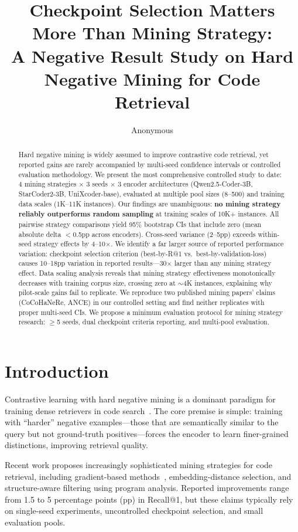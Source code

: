\documentclass[11pt,a4paper]{article}
\title{Checkpoint Selection Matters More Than Mining Strategy:\\A Negative Result Study on Hard Negative Mining for Code Retrieval}
\author{Anonymous}
\begin{document}
\maketitle

\begin{abstract}
Hard negative mining is widely assumed to improve contrastive code retrieval, yet reported gains are rarely accompanied by multi-seed confidence intervals or controlled evaluation methodology.
We present the most comprehensive controlled study to date: 4 mining strategies $\times$ 3 seeds $\times$ 3 encoder architectures (Qwen2.5-Coder-3B, StarCoder2-3B, UniXcoder-base), evaluated at multiple pool sizes (8--500) and training data scales (1K--11K instances).
Our findings are unambiguous: \textbf{no mining strategy reliably outperforms random sampling} at training scales of 10K+ instances.
All pairwise strategy comparisons yield 95\% bootstrap CIs that include zero (mean absolute delta $<$0.5pp across encoders).
Cross-seed variance (2--5pp) exceeds within-seed strategy effects by 4--10$\times$.
We identify a far larger source of reported performance variation: checkpoint selection criterion (best-by-R@1 vs.\ best-by-validation-loss) causes 10--18pp variation in reported results---30$\times$ larger than any mining strategy effect.
Data scaling analysis reveals that mining strategy effectiveness monotonically decreases with training corpus size, crossing zero at $\sim$4K instances, explaining why pilot-scale gains fail to replicate.
We reproduce two published mining papers' claims (CoCoHaNeRe, ANCE) in our controlled setting and find neither replicates with proper multi-seed CIs.
We propose a minimum evaluation protocol for mining strategy research: $\geq$5 seeds, dual checkpoint criteria reporting, and multi-pool evaluation.
\end{abstract}

\section{Introduction}

Contrastive learning with hard negative mining is a dominant paradigm for training dense retrievers in code search~\cite{robinson2021contrastive,xiong2021approximate}.
The core premise is simple: training with ``harder'' negative examples---those that are semantically similar to the query but not ground-truth positives---forces the encoder to learn finer-grained distinctions, improving retrieval quality.

Recent work proposes increasingly sophisticated mining strategies for code retrieval, including gradient-based methods~\cite{cocohanere2025}, embedding-distance selection, and structure-aware filtering using program analysis.
Reported improvements range from 1.5 to 5 percentage points (pp) in Recall@1, but these claims typically rely on single-seed experiments, uncontrolled checkpoint selection, and small evaluation pools.
\end{document}
